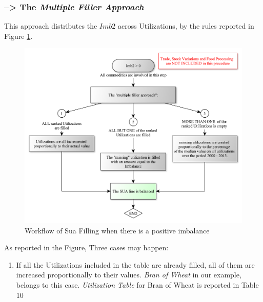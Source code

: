 \documentclass[]{article}
\providecommand{\tightlist}{%
  \setlength{\itemsep}{0pt}\setlength{\parskip}{0pt}}
\begin{document}
\subsubsection*{\texorpdfstring{--\textgreater{} The \emph{Multiple
Filler
Approach}}{--\textgreater{} The Multiple Filler Approach}}\label{the-multiple-filler-approach}

This approach distributes the \(Imb2\) across Utilizations, by the rules
reported in Figure \ref{fig:f7}.

\begin{figure}[h]

{\centering \includegraphics{images/StandBal/07b_PositiveImbalance} 

}

\caption{\label{fig:f5}Workflow of Sua Filling when there is a positive imbalance}\label{fig:f7}
\end{figure}

As reported in the Figure, Three cases may happen:

\begin{enumerate}
\def\labelenumi{\arabic{enumi}.}
\tightlist
\item
  If all the Utilizations included in the table are already filled, all
  of them are increased proportionally to their values. \emph{Bran of
  Wheat} in our example, belongs to this case. \emph{Utilization Table}
  for Bran of Wheat is reported in Table 10
\end{enumerate}
\end{document}
